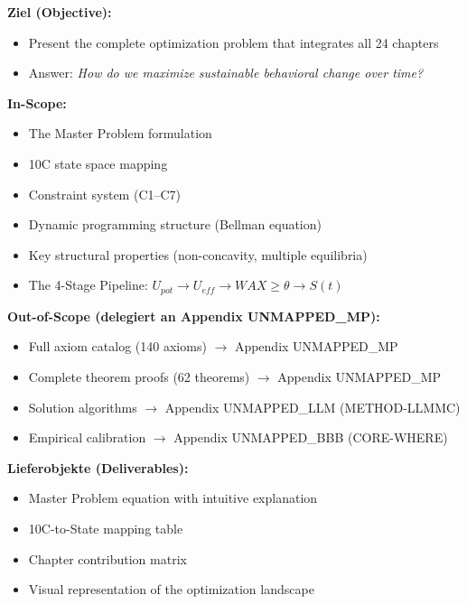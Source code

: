 \begin{tcolorbox}[colback=orange!5!white,colframe=orange!75!black,
    title=\textbf{Chapter Scope: Ziel / In-Scope / Out-of-Scope / Lieferobjekte}]

\textbf{Ziel (Objective):}
\begin{itemize}[nosep]
    \item Present the complete optimization problem that integrates all 24 chapters
    \item Answer: \textit{How do we maximize sustainable behavioral change over time?}
\end{itemize}

\textbf{In-Scope:}
\begin{itemize}[nosep]
    \item The Master Problem formulation
    \item 10C state space mapping
    \item Constraint system (C1--C7)
    \item Dynamic programming structure (Bellman equation)
    \item Key structural properties (non-concavity, multiple equilibria)
    \item The 4-Stage Pipeline: $U_{pot} \to U_{eff} \to WAX \geq \theta \to S(t)$
\end{itemize}

\textbf{Out-of-Scope (delegiert an Appendix UNMAPPED_MP):}
\begin{itemize}[nosep]
    \item Full axiom catalog (140 axioms) $\rightarrow$ Appendix UNMAPPED_MP
    \item Complete theorem proofs (62 theorems) $\rightarrow$ Appendix UNMAPPED_MP
    \item Solution algorithms $\rightarrow$ Appendix UNMAPPED_LLM (METHOD-LLMMC)
    \item Empirical calibration $\rightarrow$ Appendix UNMAPPED_BBB (CORE-WHERE)
\end{itemize}

\textbf{Lieferobjekte (Deliverables):}
\begin{itemize}[nosep]
    \item Master Problem equation with intuitive explanation
    \item 10C-to-State mapping table
    \item Chapter contribution matrix
    \item Visual representation of the optimization landscape
\end{itemize}

\end{tcolorbox}

